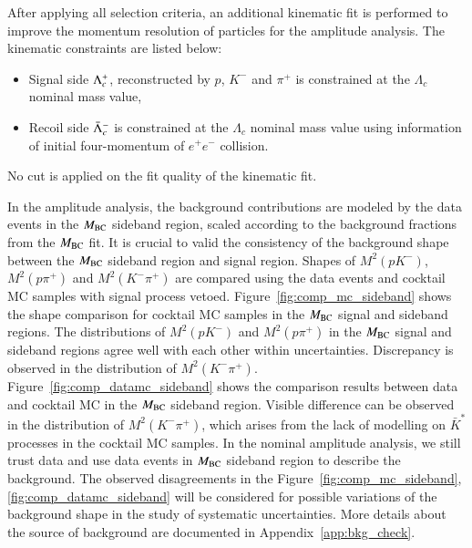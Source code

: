After applying all selection criteria, an additional kinematic fit is performed to improve the momentum resolution of particles for the amplitude analysis. The kinematic constraints are listed below:
\begin{itemize}
    \item Signal side $\Lambda_{c}^{+}$, reconstructed by $p$, $K^-$ and $\pi^+$ is constrained at the $\Lambda_c$ nominal mass value,
    \item Recoil side $\bar{\Lambda}_{c}^{-}$ is constrained at the $\Lambda_c$ nominal mass value using information of initial four-momentum of $e^+e^-$ collision.
\end{itemize}
No cut is applied on the fit quality of the kinematic fit.

In the amplitude analysis, the background contributions are modeled by the data events in the $M_{\rm{BC}}$ sideband region, scaled according to the background fractions from the $M_{\rm{BC}}$ fit. It is crucial to valid the consistency of the background shape between the $M_{\rm{BC}}$ sideband region and signal region. Shapes of $M^2(pK^-)$, $M^2(p\pi^+)$ and $M^2(K^-\pi^+)$ are compared using the data events and cocktail MC samples with signal process vetoed. Figure~\ref{fig:comp_mc_sideband} shows the shape comparison for cocktail MC samples in the $M_{\rm{BC}}$ signal and sideband regions. The distributions of $M^2(pK^-)$ and $M^2(p\pi^+)$ in the $M_{\rm{BC}}$ signal and sideband regions agree well with each other within uncertainties. Discrepancy is observed in the distribution of $M^2(K^-\pi^+)$. 
Figure~\ref{fig:comp_datamc_sideband} shows the comparison results between data and cocktail MC in the $M_{\rm{BC}}$ sideband region. Visible difference can be observed in the distribution of $M^2(K^-\pi^+)$, which arises from the lack of modelling on $\bar{K}^*$ processes in the cocktail MC samples. In the nominal amplitude analysis, we still trust data and use data events in $M_{\rm{BC}}$ sideband region to describe the background. The observed disagreements in the Figure~\ref{fig:comp_mc_sideband}, \ref{fig:comp_datamc_sideband} will be considered for possible variations of the background shape in the study of systematic uncertainties. More details about the source of background are documented in Appendix~\ref{app:bkg_check}.

